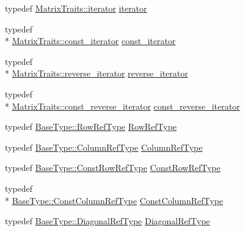 \begin{DoxyCompactItemize}
\item 
typedef \hyperlink{classvct_fixed_size_matrix_traits_a677065481ada218e2559cdec92e97fd8}{Matrix\-Traits\-::iterator} \hyperlink{classvct_fixed_size_matrix_base_aeeeca0bc3fc21d2e48fd8e1ae2eaf836}{iterator}
\item 
typedef \\*
\hyperlink{classvct_fixed_size_matrix_traits_a8f7178fb03f45772c705fba16e08065d}{Matrix\-Traits\-::const\-\_\-iterator} \hyperlink{classvct_fixed_size_matrix_base_a53dcfd245b0c11371d50c406fa59db61}{const\-\_\-iterator}
\item 
typedef \\*
\hyperlink{classvct_fixed_size_matrix_traits_aa132098455575ae9bc4962c994273baa}{Matrix\-Traits\-::reverse\-\_\-iterator} \hyperlink{classvct_fixed_size_matrix_base_aa437178891b922bbc199cd059d2a79fe}{reverse\-\_\-iterator}
\item 
typedef \\*
\hyperlink{classvct_fixed_size_matrix_traits_a362cff0931f811552609307e80af3eab}{Matrix\-Traits\-::const\-\_\-reverse\-\_\-iterator} \hyperlink{classvct_fixed_size_matrix_base_a82f39f6102bda23fe977efe94ebf06dd}{const\-\_\-reverse\-\_\-iterator}
\item 
typedef \hyperlink{classvct_fixed_size_const_matrix_base_a2ce1bc7d955f66d28462cb34b62d69b7}{Base\-Type\-::\-Row\-Ref\-Type} \hyperlink{classvct_fixed_size_matrix_base_a99d07082e6588c81902cf19226ebf93b}{Row\-Ref\-Type}
\item 
typedef \hyperlink{classvct_fixed_size_const_matrix_base_a9cbbc3a040a90709bdeac3b94c766131}{Base\-Type\-::\-Column\-Ref\-Type} \hyperlink{classvct_fixed_size_matrix_base_a59c0bb73e3e0a4d1daea3a017eceaac7}{Column\-Ref\-Type}
\item 
typedef \hyperlink{classvct_fixed_size_const_matrix_base_a74355396eec7437755398c2810e0df41}{Base\-Type\-::\-Const\-Row\-Ref\-Type} \hyperlink{classvct_fixed_size_matrix_base_a506ec116d1e4c9c1b5d89f9f952e5b2d}{Const\-Row\-Ref\-Type}
\item 
typedef \\*
\hyperlink{classvct_fixed_size_const_matrix_base_a68ed47f84a2855832fa0c18fafda6843}{Base\-Type\-::\-Const\-Column\-Ref\-Type} \hyperlink{classvct_fixed_size_matrix_base_a5ef3c78aaccbfe9c5e4843bffa2770b5}{Const\-Column\-Ref\-Type}
\item 
typedef \hyperlink{classvct_fixed_size_const_matrix_base_ae0b335e845233b49e01f24c1518ee6a1}{Base\-Type\-::\-Diagonal\-Ref\-Type} \hyperlink{classvct_fixed_size_matrix_base_af379c84a0eb55ebfac0c6bf715eb28e3}{Diagonal\-Ref\-Type}

\end{DoxyCompactItemize}
